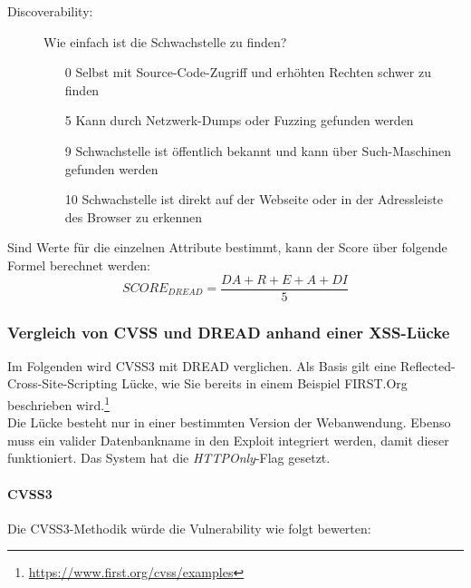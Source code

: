 \begin{description}
			\item[Discoverability: ] Wie einfach ist die Schwachstelle zu finden?
			\begin{itemize}
				\item[0] Selbst mit Source-Code-Zugriff und erhöhten Rechten schwer zu finden
				\item[5] Kann durch Netzwerk-Dumps oder Fuzzing gefunden werden
				\item[9] Schwachstelle ist öffentlich bekannt und kann über Such-Maschinen gefunden werden
				\item[10] Schwachstelle ist direkt auf der Webseite oder in der Adressleiste des Browser zu erkennen
			\end{itemize}
		\end{description}

 Sind Werte für die einzelnen Attribute bestimmt, kann der Score über folgende Formel berechnet werden:\cite{DREADOpenStack}
 \[ 
SCORE_{DREAD} = \frac{DA + R + E + A + DI}{5} 
\]

	\subsubsection{Vergleich von CVSS und DREAD anhand einer XSS-Lücke}
	Im Folgenden wird CVSS3 mit DREAD verglichen. Als Basis gilt eine Reflected-Cross-Site-Scripting Lücke, wie Sie bereits in einem Beispiel FIRST.Org beschrieben wird.\footnote{\url{https://www.first.org/cvss/examples}}\\
	
	Die Lücke besteht nur in einer bestimmten Version der Webanwendung. Ebenso muss ein valider Datenbankname in den Exploit integriert werden, damit dieser funktioniert. Das System hat die \textit{HTTPOnly}-Flag gesetzt.

	\paragraph{CVSS3}\label{ref:VerglCVSS3}
	Die CVSS3-Methodik würde die Vulnerability wie folgt bewerten:
	
